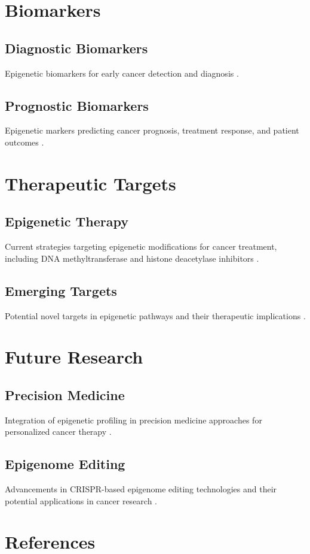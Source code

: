 \documentclass[12pt]{article}
\begin{document}
\section{Biomarkers}
\subsection{Diagnostic Biomarkers}
Epigenetic biomarkers for early cancer detection and diagnosis \citep{wang2018epigenetic, khan2019epigenetic}.

\subsection{Prognostic Biomarkers}
Epigenetic markers predicting cancer prognosis, treatment response, and patient outcomes \citep{sharma2020epigenetic, touleimat2020dna}.

\section{Therapeutic Targets}
\subsection{Epigenetic Therapy}
Current strategies targeting epigenetic modifications for cancer treatment, including DNA methyltransferase and histone deacetylase inhibitors \citep{santos2017epigenetic, dawson2017epigenetic}.

\subsection{Emerging Targets}
Potential novel targets in epigenetic pathways and their therapeutic implications \citep{ganesan2019targeting, maes2019novel}.

\section{Future Research}
\subsection{Precision Medicine}
Integration of epigenetic profiling in precision medicine approaches for personalized cancer therapy \citep{brocks2017epigenetic, wu2020role}.

\subsection{Epigenome Editing}
Advancements in CRISPR-based epigenome editing technologies and their potential applications in cancer research \citep{liu2020epigenome, keung2019applications}.

\section*{References}


\end{document}
